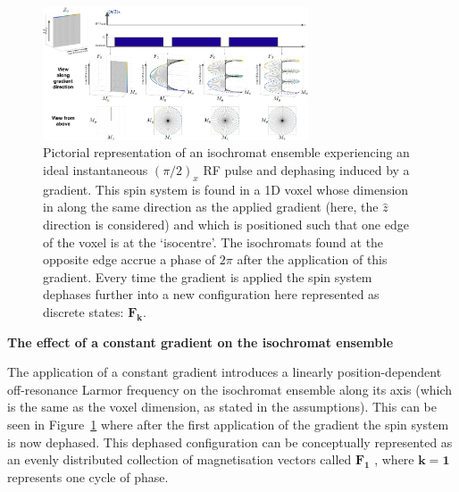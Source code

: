 \begin{figure}[H]
    \centering
    \includegraphics[angle=90,width=0.7\textwidth, keepaspectratio]{images/mrf/effectOfGradsEPG}
    \caption{Pictorial representation of an isochromat ensemble experiencing an ideal instantaneous $(\pi/2)_x$ RF pulse and dephasing induced by a gradient.
    This spin system is found in a 1D voxel whose dimension in along the same direction as the applied gradient (here, the $\hat{z}$ direction is considered) and which is positioned such that one edge of the voxel is at the `isocentre'. The isochromats found at the opposite edge accrue a phase of $2\pi$ after the application of this gradient.
    Every time the gradient is applied the spin system dephases further into a new configuration here represented as discrete states: $\bm{F_k}$.}
    \label{fig:effectOfGradsEPG}
\end{figure}

\textbf{The effect of a constant gradient on the isochromat ensemble} 

The application of a constant gradient introduces a linearly position-dependent off-resonance Larmor frequency on the isochromat ensemble along its axis (which is the same as the voxel dimension, as stated in the assumptions).
This can be seen in Figure~\ref{fig:effectOfGradsEPG} where after the first application of the gradient the spin system is now dephased.
This dephased configuration can be conceptually represented as an evenly distributed collection of magnetisation vectors called $\bm{F_1}$ \cite{Hennig1988} \cite{Scheffler1999}, where $\bm{k=1}$ represents one cycle of phase.

